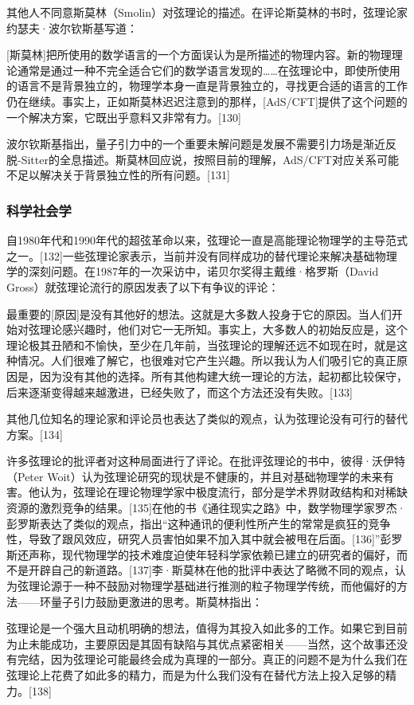 其他人不同意斯莫林（Smolin）对弦理论的描述。在评论斯莫林的书时，弦理论家约瑟夫·波尔钦斯基写道：

[斯莫林]把所使用的数学语言的一个方面误认为是所描述的物理内容。新的物理理论通常是通过一种不完全适合它们的数学语言发现的……在弦理论中，即使所使用的语言不是背景独立的，物理学本身一直是背景独立的，寻找更合适的语言的工作仍在继续。事实上，正如斯莫林迟迟注意到的那样，[AdS/CFT]提供了这个问题的一个解决方案，它既出乎意料又非常有力。[130]

波尔钦斯基指出，量子引力中的一个重要未解问题是发展不需要引力场是渐近反脱-Sitter的全息描述。斯莫林回应说，按照目前的理解，AdS/CFT对应关系可能不足以解决关于背景独立性的所有问题。[131]
\subsubsection{科学社会学}  
自1980年代和1990年代的超弦革命以来，弦理论一直是高能理论物理学的主导范式之一。[132]一些弦理论家表示，当前并没有同样成功的替代理论来解决基础物理学的深刻问题。在1987年的一次采访中，诺贝尔奖得主戴维·格罗斯（David Gross）就弦理论流行的原因发表了以下有争议的评论：

最重要的[原因]是没有其他好的想法。这就是大多数人投身于它的原因。当人们开始对弦理论感兴趣时，他们对它一无所知。事实上，大多数人的初始反应是，这个理论极其丑陋和不愉快，至少在几年前，当弦理论的理解还远不如现在时，就是这种情况。人们很难了解它，也很难对它产生兴趣。所以我认为人们吸引它的真正原因是，因为没有其他的选择。所有其他构建大统一理论的方法，起初都比较保守，后来逐渐变得越来越激进，已经失败了，而这个方法还没有失败。[133]

其他几位知名的理论家和评论员也表达了类似的观点，认为弦理论没有可行的替代方案。[134]

许多弦理论的批评者对这种局面进行了评论。在批评弦理论的书中，彼得·沃伊特（Peter Woit）认为弦理论研究的现状是不健康的，并且对基础物理学的未来有害。他认为，弦理论在理论物理学家中极度流行，部分是学术界财政结构和对稀缺资源的激烈竞争的结果。[135]在他的书《通往现实之路》中，数学物理学家罗杰·彭罗斯表达了类似的观点，指出“这种通讯的便利性所产生的常常是疯狂的竞争性，导致了跟风效应，研究人员害怕如果不加入其中就会被甩在后面。[136]”彭罗斯还声称，现代物理学的技术难度迫使年轻科学家依赖已建立的研究者的偏好，而不是开辟自己的新道路。[137]李·斯莫林在他的批评中表达了略微不同的观点，认为弦理论源于一种不鼓励对物理学基础进行推测的粒子物理学传统，而他偏好的方法——环量子引力鼓励更激进的思考。斯莫林指出：

弦理论是一个强大且动机明确的想法，值得为其投入如此多的工作。如果它到目前为止未能成功，主要原因是其固有缺陷与其优点紧密相关——当然，这个故事还没有完结，因为弦理论可能最终会成为真理的一部分。真正的问题不是为什么我们在弦理论上花费了如此多的精力，而是为什么我们没有在替代方法上投入足够的精力。[138]

